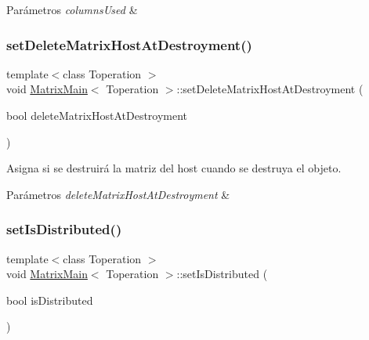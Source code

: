 \begin{DoxyParams}{Parámetros}
{\em columns\+Used} & \\
\hline
\end{DoxyParams}
\mbox{\label{classMatrixMain_a9c8cf3be535a8bb042f6ee0ddaafc6b1}} 
\subsubsection{\texorpdfstring{set\+Delete\+Matrix\+Host\+At\+Destroyment()}{setDeleteMatrixHostAtDestroyment()}}
{\footnotesize\ttfamily template$<$class Toperation $>$ \\
void \hyperlink{classMatrixMain}{Matrix\+Main}$<$ Toperation $>$\+::set\+Delete\+Matrix\+Host\+At\+Destroyment (\begin{DoxyParamCaption}\item[{bool}]{delete\+Matrix\+Host\+At\+Destroyment }\end{DoxyParamCaption})}



Asigna si se destruirá la matriz del host cuando se destruya el objeto. 


\begin{DoxyParams}{Parámetros}
{\em delete\+Matrix\+Host\+At\+Destroyment} & \\
\hline
\end{DoxyParams}
\mbox{\label{classMatrixMain_a8c00132316f5c4c39259281d8e9d3e95}} 
\subsubsection{\texorpdfstring{set\+Is\+Distributed()}{setIsDistributed()}}
{\footnotesize\ttfamily template$<$class Toperation $>$ \\
void \hyperlink{classMatrixMain}{Matrix\+Main}$<$ Toperation $>$\+::set\+Is\+Distributed (\begin{DoxyParamCaption}\item[{bool}]{is\+Distributed }\end{DoxyParamCaption})}



